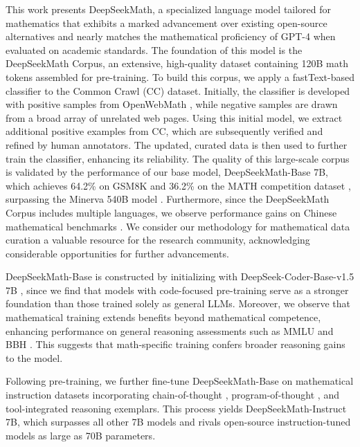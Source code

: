 This work presents DeepSeekMath, a specialized language model tailored for mathematics that exhibits a marked advancement over existing open-source alternatives and nearly matches the mathematical proficiency of GPT-4 when evaluated on academic standards. The foundation of this model is the DeepSeekMath Corpus, an extensive, high-quality dataset containing 120B math tokens assembled for pre-training. To build this corpus, we apply a fastText-based classifier \citep{joulin2016fasttext} to the Common Crawl (CC) dataset. Initially, the classifier is developed with positive samples from OpenWebMath \citep{openwebmath}, while negative samples are drawn from a broad array of unrelated web pages. Using this initial model, we extract additional positive examples from CC, which are subsequently verified and refined by human annotators. The updated, curated data is then used to further train the classifier, enhancing its reliability. The quality of this large-scale corpus is validated by the performance of our base model, DeepSeekMath-Base 7B, which achieves 64.2\% on GSM8K \citep{gsm8k} and 36.2\% on the MATH competition dataset \citep{MATH}, surpassing the Minerva 540B model \citep{minerva}. Furthermore, since the DeepSeekMath Corpus includes multiple languages, we observe performance gains on Chinese mathematical benchmarks \citep{wei2023cmath,agieval}. We consider our methodology for mathematical data curation a valuable resource for the research community, acknowledging considerable opportunities for further advancements.

DeepSeekMath-Base is constructed by initializing with DeepSeek-Coder-Base-v1.5 7B \citep{deepseek-coder}, since we find that models with code-focused pre-training serve as a stronger foundation than those trained solely as general LLMs. Moreover, we observe that mathematical training extends benefits beyond mathematical competence, enhancing performance on general reasoning assessments such as MMLU \citep{mmlu} and BBH \citep{bbh}. This suggests that math-specific training confers broader reasoning gains to the model.

Following pre-training, we further fine-tune DeepSeekMath-Base on mathematical instruction datasets incorporating chain-of-thought \citep{cot}, program-of-thought \citep{pot,pal}, and tool-integrated reasoning \citep{tora} exemplars. This process yields DeepSeekMath-Instruct 7B, which surpasses all other 7B models and rivals open-source instruction-tuned models as large as 70B parameters.

